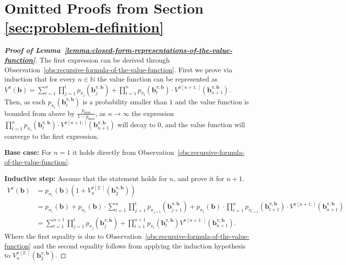 \section{Omitted Proofs from Section \ref{sec:problem-definition}}
\label{sec:problem-definition-proofs}

\begin{proof}[\normalfont\bfseries Proof of Lemma~\ref{lemma:closed-form-representations-of-the-value-function}]
    The first expression can be derived through Observation~\ref{obs:recursive-formula-of-the-value-function}.
    First we prove via induction that for every $n \in \mathbb{N}$ the value function can be represented as $V^{\pi}(\bm{b}) = \sum_{t=1}^{n} \prod_{j=1}^{t} p_{\pi_{j}}(\bm{b}^{\pi, \bm{b}}_j) + \prod_{t=1}^{n} p_{\pi_{t}}(\bm{b}^{\pi, \bm{b}}_t) \cdot V^{\pi[n+1:]}(\bm{b}^{\pi, \bm{b}}_{n+1})$. Then, as each $p_{\pi_{t}}(\bm{b}^{\pi, \bm{b}}_t)$ is a probability smaller than $1$ and the value function is bounded from above by $\frac{p_{\max}}{1-p_{\max}}$, as $n \to \infty$ the expression $\prod_{t=1}^{n} p_{\pi_{t}}(\bm{b}^{\pi, \bm{b}}_t) \cdot V^{\pi[n+1:]}(\bm{b}^{\pi, \bm{b}}_{n+1})$ will decay to $0$, and the value function will converge to the first expression.

    \textbf{Base case:} For $n=1$ it holds directly from Observation~\ref{obs:recursive-formula-of-the-value-function}.

    \textbf{Inductive step:} Assume that the statement holds for $n$, and prove it for $n+1$.
    \begin{align*}
        V^{\pi}(\bm{b}) & = p_{\pi_{1}}(\bm{b})(1 + V^{\pi[2:]}_n(\bm{b}^{\pi, \bm{b}}_{2}))    \\
        & = p_{\pi_{1}}(\bm{b}) + p_{\pi_{1}}(\bm{b}) \cdot \sum_{t=1}^{n} \prod_{j=1}^{t} p_{\pi_{j+1}}(\bm{b}^{\pi, \bm{b}}_{j+1}) + p_{\pi_{1}}(\bm{b}) \cdot \prod_{t=1}^{n} p_{\pi_{t+1}}(\bm{b}^{\pi, \bm{b}}_{t+1}) \cdot V^{\pi[n+1:]}(\bm{b}^{\pi, \bm{b}}_{n+1}) \\
        & = \sum_{t=1}^{n+1} \prod_{j=1}^{t} p_{\pi_{j}}(\bm{b}^{\pi, \bm{b}}_j) + \prod_{t=1}^{n+1} p_{\pi_{t}}(\bm{b}^{\pi, \bm{b}}_t) V^{\pi[n+1:]}(\bm{b}^{\pi, \bm{b}}_{n+1}).  
    \end{align*}
    Where the first equality is due to Observation~\ref{obs:recursive-formula-of-the-value-function} and the second equality follows from applying the induction hypothesis to $V^{\pi[2:]}_n(\bm{b}^{\pi, \bm{b}}_{2})$.


\end{proof}
